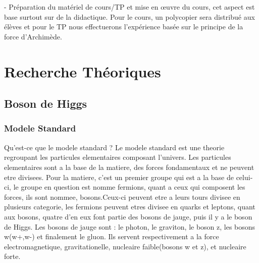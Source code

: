 \documentclass[a4paper,12pt,oneside,openright]{book} %
\begin{document}
-	Pr\'eparation du mat\'eriel de cours/TP et mise en \oe uvre du cours, cet aspect est base surtout sur de la didactique. Pour le cours, un polycopier sera distribu\'e aux \'el\`eves et pour le TP nous effectuerons l'exp\'erience bas\'ee sur le principe de la force d'Archim\`ede.


%                                               

\chapter{Recherche Th\'eoriques}
\fancyhead[R]{\leftmark}

    \section{Boson de Higgs}
        \subsection{Modele Standard}
Qu'est-ce que le modele standard ?
Le modele standard est une theorie regroupant les particules elementaires composant l'univers. Les  particules  elementaires sont a la base de la matiere, des forces fondamentaux et ne peuvent etre divisees. Pour la matiere, c'est  un premier groupe qui est a la base de celui-ci, le groupe en question est nomme fermions, quant a ceux qui composent les forces, ils sont nommee,  bosons.Ceux-ci peuvent etre a leurs tours divisee en plusieurs categorie, les fermions peuvent etres divisee en quarks et leptons, quant aux bosons, quatre d'en eux font partie des bosons de jauge, puis il y a le boson de Higgs. Les bosons de jauge sont : le photon, le graviton, le boson z, les bosons w(w\up+,w\up-) et finalement le gluon. Ils servent respectivement a la force electromagnetique, gravitationelle, nucleaire faible(bosons w et z), et nucleaire forte.


\end{document}
